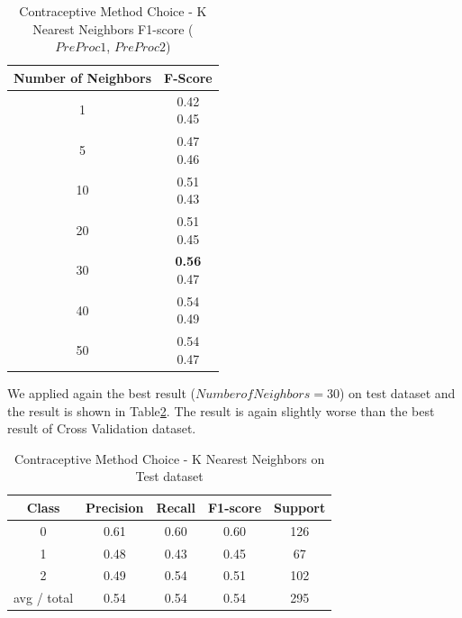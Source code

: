 \begin{table}[p]
\begin{center}
\begin{tabular}{|c|c|}
\hline Number of Neighbors & F-Score \\

\hline 1 & \minibox{0.42\\ 0.45} \\
\hline 5 & \minibox{0.47\\ 0.46} \\
\hline 10 & \minibox{0.51\\ 0.43} \\
\hline 20 & \minibox{0.51\\ 0.45} \\
\hline 30 & \minibox{\textbf{0.56}\\ 0.47} \\
\hline 40 & \minibox{0.54\\ 0.49} \\
\hline 50 & \minibox{0.54\\ 0.47} \\

\hline
\end{tabular}

\caption{Contraceptive Method Choice - K Nearest Neighbors  F1-score ($PreProc1$, $PreProc2$)}
\label{ds1:table:knn}
\end{center}
\end{table}

We applied again the best result ($Number of Neighbors=30$) on test dataset and the result is shown in Table\ref{ds1:table:knn-test}. The result is again slightly worse than the best result of Cross Validation dataset.


\begin{table}[p]
\begin{center}
\begin{tabular}{|c|c|c|c|c|}
\hline Class & Precision & Recall & F1-score & Support \\

\hline 0 & 0.61 & 0.60 & 0.60 & 126\\
\hline 1 & 0.48 & 0.43 & 0.45 & 67\\
\hline 2 & 0.49 & 0.54 & 0.51 & 102\\
\hline avg / total & 0.54 & 0.54 & 0.54 & 295\\
\hline
\end{tabular}

\caption{Contraceptive Method Choice - K Nearest Neighbors on Test dataset}
\label{ds1:table:knn-test}
\end{center}
\end{table}

